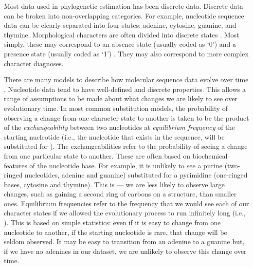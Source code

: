 Most data used in phylogenetic estimation has been discrete data.
Discrete data can be broken into non-overlapping categories.
For example, nucleotide sequence data can be clearly separated into four states: adenine, cytosine, guanine, and thymine.
Morphological characters are often divided into discrete states \citep{de1985ontogenetic}.
Most simply, these may correspond to an absence state (usually coded as `0') and a presence state (usually coded as `1') \citep{watrous1981}.
They may also correspond to more complex character diagnoses.

There are many models to describe how molecular sequence data evolve over time \citep{Jukes1969, Kimura1980, Felsenstein1981, Hasegawa1985, Tavare1986}.
Nucleotide data tend to have well-defined and discrete properties.
This allows a range of assumptions to be made about what changes we are likely to see over evolutionary time.
In most common  substitution models, the probability of observing a change from one character state to another is taken to be the product of the \textit{exchangeability} between two nucleotides at \textit{equilibrium frequency} of the starting nucleotide (i.e., the nucleotide that exists in the sequence,  will be substituted for ).
The exchangeabilities refer to the probability of seeing a change from one particular state to another.
These are often based on biochemical features of the nucleotide base.
For example, it is unlikely to see a purine (two-ringed nucleotides, adenine and guanine) substituted for a pyrimidine (one-ringed bases, cytosine and thymine).
This is  --- we are less likely to observe large changes, such as gaining a second ring of carbons on a structure, than smaller ones.
Equilibrium frequencies refer to the frequency that we would see each of our character states if we allowed the evolutionary process to run infinitely long (i.e., ).
This is based on simple statistics: even if it is easy to change from one nucleotide to another, if the starting nucleotide is rare, that change will be seldom observed.
It may be easy to transition from an adenine to a guanine but, if we have no adenines in our dataset, we are unlikely to observe this change over time.

